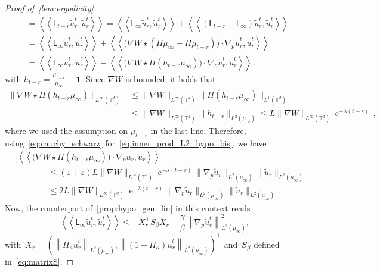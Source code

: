 \documentclass[onefignum,onetabnum]{siamart251216} %
\DeclareMathOperator{\e}{e}
\newcommand{\norm}[1]{\left\lVert#1\right\rVert}
\newcommand{\torus}{\mathbb T}
\renewcommand{\leq}{\leqslant}
\newcommand{\mescin}{\mu}
\newcommand{\projvit}{\Pi_{\kappa}}
\newcommand{\dblangle}[1]{\left\langle\!\left\langle #1 \right\rangle\!\right\rangle}
\newcommand{\norml}[1]{\norm{#1}_{L^2(\mescin_\infty)}}
\newcommand{\eps}{\varepsilon}
\theoremstyle{plain}
\numberwithin{equation}{section}
\numberwithin{theorem}{section}
\begin{document}
\begin{proof}[Proof of~\cref{lem:ergodicity}]
\begin{align*}
    &=  \dblangle{\mathsf L_{t-r} \widetilde u_r^t, \widetilde u_r^t}
    =  \dblangle{\mathsf L_{\infty} \widetilde u_r^t, \widetilde u_r^t}
    +  \dblangle{(\mathsf L_{t-r} - \mathsf L_{\infty}) \widetilde u_r^t, \widetilde u_r^t} \, \\
    &=   \dblangle{\mathsf L_{\infty} \widetilde u_r^t, \widetilde u_r^t}
    +  \dblangle{\bigl(\nabla W \star (\Pi \mu_{\infty} - \Pi \mu_{t-r})\bigr) \cdot \nabla_p \widetilde u_r^t, \widetilde u_r^t} \, \\
    &=   \dblangle{\mathsf L_{\infty} \widetilde u_r^t, \widetilde u_r^t}
    -  \dblangle{\bigl(\nabla W \star \Pi (h_{t-r} \mu_{\infty})\bigr) \cdot \nabla_p \widetilde u_r^t, \widetilde u_r^t} \, ,
\end{align*}
with $h_{t-r} = \displaystyle\frac{\mu_{t-r}}{\mu_{\infty}} - \textbf{1}$.
Since $\nabla W$ is bounded,
it holds that
\begin{align*}
    \lVert \nabla W \star \Pi (h_{t-r} \mu_{\infty}) \rVert_{L^{\infty}(\torus^d)}
    &\leq \lVert \nabla W \rVert_{L^{\infty}(\torus^d)} \|\Pi (h_{t-r} \mu_{\infty})\|_{L^1(\torus^d)} \\
    &\leq \lVert \nabla W \rVert_{L^{\infty}(\torus^d)} \|h_{t-r}\|_{L^2(\mu_{\infty})}
    \leq L \lVert \nabla W \rVert_{L^{\infty}(\torus^d)} \e^{-\lambda (t-r)} \, ,
\end{align*}
where we used the assumption on $\mu_{t-r}$ in the last line.
Therefore, using~\eqref{eq:cauchy_schwarz} for~\eqref{eq:inner_prod_L2_hypo_bis}, we have
\begin{align*}
    &\left|\dblangle{\bigl(\nabla W \star \Pi (h_{t-r} \mu_{\infty})\bigr) \cdot \nabla_p \widetilde u_r, \widetilde u_r}\right| \\
    &\qquad \qquad\leq (1+\eps)L \lVert \nabla W \rVert_{L^{\infty}(\torus^d)} \e^{- \lambda (t - r)} \|\nabla_p \widetilde u_r\|_{L^2(\mu_{\infty})} \|\widetilde u_r\|_{L^2(\mu_{\infty})} \,
     \\
    &\qquad \qquad\leq 2L \lVert \nabla W \rVert_{L^{\infty}(\torus^d)} \e^{- \lambda (t - r)} \|\nabla_p \widetilde u_r\|_{L^2(\mu_{\infty})} \|\widetilde u_r\|_{L^2(\mu_{\infty})} \,.
\end{align*}
Now, the counterpart of~\cref{prop:hypo_gen_lin} in this context reads
\[
\dblangle{\mathsf L_{\infty} \widetilde u_r^t, \widetilde u_r^t} \leq -X_r^\top S_\beta X_r -\frac{\gamma}{\beta}\norml{\nabla_p \widetilde u_r^t}^2,
\]
with~$X_r = (\norml{\projvit\widetilde u_r^t},\norml{(1-\projvit)\widetilde u_r^t})^\top$ and~$S_\beta$ defined in~\eqref{eq:matrixS}.

\end{proof}
\end{document}
